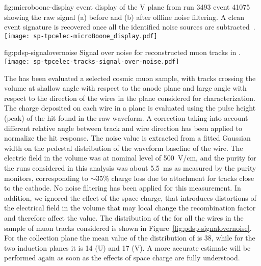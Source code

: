 \begin{dunefigure}
{fig:microboone-display}
{ \twod event display of the V plane from run 3493 
event 41075 showing the raw signal (a) before and (b) after offline 
noise filtering. A clean event signature is recovered once all the 
identified noise sources are subtracted~\cite{Acciarri:2017sde}.}
\texttt{[image: sp-tpcelec-microBoone\_display.pdf]}
\end{dunefigure}

\begin{dunefigure}
{fig:pdsp-signalovernoise}
        {Signal over noise for reconstructed muon tracks in .}
\texttt{[image: sp-tpcelec-tracks-signal-over-noise.pdf]}
\end{dunefigure}

The  has been evaluated a selected cosmic muon sample, with tracks
crossing the  volume at shallow angle with respect to the anode plane and
large angle with respect to the direction of the wires in the plane considered
for  characterization. The charge deposited on each wire in a plane is evaluated
using the pulse height (peak) of the hit found in the raw waveform.
A correction taking into account different relative angle between track and wire
direction has been applied to normalize the hit response. The noise value is extracted
from a fitted Gaussian width on the pedestal distribution of the waveform baseline of the
wire. The electric field in the  volume was at nominal level of \SI{500}{V/cm},
and the  purity for the runs considered in this analysis was about \SI{5.5}{ms}
as measured by the purity monitors, corresponding to $\sim35$\% charge loss due to
attachment for tracks close to the cathode. No noise filtering has been applied for
this measurement. In addition, we ignored the effect of the space charge, that introduces
distortions of the electrical field in the  volume that may local change the
recombination factor and therefore affect the  value. The distribution of
the  for all the wires in the sample of muon tracks considered is shown
in Figure~\ref{fig:pdsp-signalovernoise}. For the collection plane the mean value
of the distribution of  is 38, while for the two induction planes it is
14 (U) and 17 (V). A more accurate  estimate will be performed again as
soon as the effects of space charge are fully understood.

